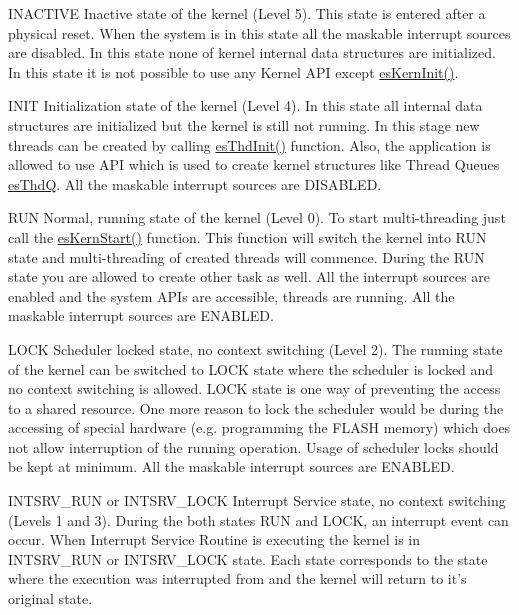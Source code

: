 \begin{DoxyParagraph}{I\-N\-A\-C\-T\-I\-V\-E}
Inactive state of the kernel (Level 5). This state is entered after a physical reset. When the system is in this state all the maskable interrupt sources are disabled. In this state none of kernel internal data structures are initialized. In this state it is not possible to use any Kernel A\-P\-I except \hyperlink{group__kern__general_ga9e9ff699d62d6035cd51121bb3140704}{es\-Kern\-Init()}.
\end{DoxyParagraph}
\begin{DoxyParagraph}{I\-N\-I\-T}
Initialization state of the kernel (Level 4). In this state all internal data structures are initialized but the kernel is still not running. In this stage new threads can be created by calling \hyperlink{group__kern__thd_gac91734f3ee867b519f59bf81cc7fde88}{es\-Thd\-Init()} function. Also, the application is allowed to use A\-P\-I which is used to create kernel structures like Thread Queues \hyperlink{structesThdQ}{es\-Thd\-Q}. All the maskable interrupt sources are D\-I\-S\-A\-B\-L\-E\-D.
\end{DoxyParagraph}
\begin{DoxyParagraph}{R\-U\-N}
Normal, running state of the kernel (Level 0). To start multi-\/threading just call the \hyperlink{group__kern__general_ga0e7a0a6b9c02df58de0f98de0229a09d}{es\-Kern\-Start()} function. This function will switch the kernel into {\ttfamily R\-U\-N} state and multi-\/threading of created threads will commence. During the {\ttfamily R\-U\-N} state you are allowed to create other task as well. All the interrupt sources are enabled and the system A\-P\-Is are accessible, threads are running. All the maskable interrupt sources are E\-N\-A\-B\-L\-E\-D.
\end{DoxyParagraph}
\begin{DoxyParagraph}{L\-O\-C\-K}
Scheduler locked state, no context switching (Level 2). The running state of the kernel can be switched to {\ttfamily L\-O\-C\-K} state where the scheduler is locked and no context switching is allowed. {\ttfamily L\-O\-C\-K} state is one way of preventing the access to a shared resource. One more reason to lock the scheduler would be during the accessing of special hardware (e.\-g. programming the F\-L\-A\-S\-H memory) which does not allow interruption of the running operation. Usage of scheduler locks should be kept at minimum. All the maskable interrupt sources are E\-N\-A\-B\-L\-E\-D.
\end{DoxyParagraph}
\begin{DoxyParagraph}{I\-N\-T\-S\-R\-V\-\_\-\-R\-U\-N or I\-N\-T\-S\-R\-V\-\_\-\-L\-O\-C\-K}
Interrupt Service state, no context switching (Levels 1 and 3). During the both states {\ttfamily R\-U\-N} and {\ttfamily L\-O\-C\-K}, an interrupt event can occur. When Interrupt Service Routine is executing the kernel is in {\ttfamily I\-N\-T\-S\-R\-V\-\_\-\-R\-U\-N} or {\ttfamily I\-N\-T\-S\-R\-V\-\_\-\-L\-O\-C\-K} state. Each state corresponds to the state where the execution was interrupted from and the kernel will return to it's original state.
\end{DoxyParagraph}
